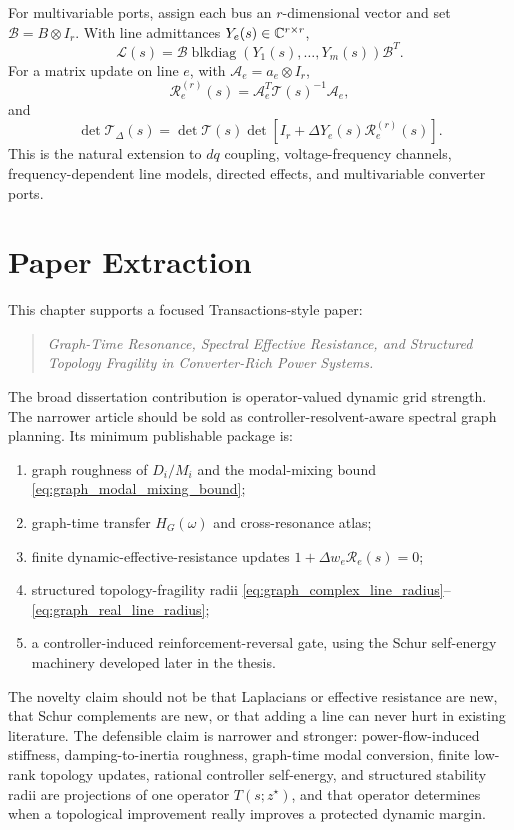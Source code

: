 For multivariable ports, assign each bus an \(r\)-dimensional vector and set
\(\mathcal B=B\otimes I_r\). With line admittances
\(Y_e(s)\in\mathbb{C}^{r\times r}\),
\begin{equation}
  \mathcal L(s)
  =
  \mathcal B
  \operatorname{blkdiag}(Y_1(s),\ldots,Y_m(s))
  \mathcal B^T.
  \label{eq:graph_matrix_laplacian}
\end{equation}
For a matrix update on line \(e\), with \(\mathcal A_e=a_e\otimes I_r\),
\begin{equation}
  \mathcal R_e^{(r)}(s)
  =
  \mathcal A_e^T\mathcal T(s)^{-1}\mathcal A_e,
  \label{eq:graph_matrix_effective_resistance}
\end{equation}
and
\begin{equation}
  \det\mathcal T_\Delta(s)
  =
  \det\mathcal T(s)
  \det\!\left[I_r+\Delta Y_e(s)\mathcal R_e^{(r)}(s)\right].
  \label{eq:graph_matrix_det_update}
\end{equation}
This is the natural extension to \(dq\) coupling, voltage-frequency channels,
frequency-dependent line models, directed effects, and multivariable converter
ports.

\section{Paper Extraction}

This chapter supports a focused Transactions-style paper:
\begin{quote}
\itshape
Graph-Time Resonance, Spectral Effective Resistance, and Structured Topology
Fragility in Converter-Rich Power Systems.
\end{quote}
The broad dissertation contribution is operator-valued dynamic grid strength.
The narrower article should be sold as controller-resolvent-aware spectral
graph planning. Its minimum publishable package is:
\begin{enumerate}
\item graph roughness of \(D_i/M_i\) and the modal-mixing bound
\eqref{eq:graph_modal_mixing_bound};
\item graph-time transfer \(H_G(\omega)\) and cross-resonance atlas;
\item finite dynamic-effective-resistance updates
\(1+\Delta w_e\mathcal R_e(s)=0\);
\item structured topology-fragility radii
\eqref{eq:graph_complex_line_radius}--\eqref{eq:graph_real_line_radius};
\item a controller-induced reinforcement-reversal gate, using the Schur
self-energy machinery developed later in the thesis.
\end{enumerate}
The novelty claim should not be that Laplacians or effective resistance are
new, that Schur complements are new, or that adding a line can never hurt in
existing literature. The defensible claim is narrower and stronger:
power-flow-induced stiffness, damping-to-inertia roughness, graph-time modal
conversion, finite low-rank topology updates, rational controller self-energy,
and structured stability radii are projections of one operator
\(T(s;z^\star)\), and that operator determines when a topological improvement
really improves a protected dynamic margin.
